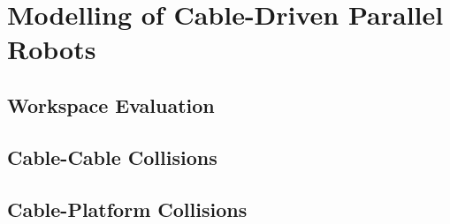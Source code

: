 \section{Modelling of Cable-Driven Parallel Robots}

	\subsection{}

	\subsection{}

	\subsection{}

	\subsection{}

	\subsection{}

	\subsection{}

	\subsection{Workspace Evaluation}

	\subsection{Cable-Cable Collisions}

	\subsection{Cable-Platform Collisions}
